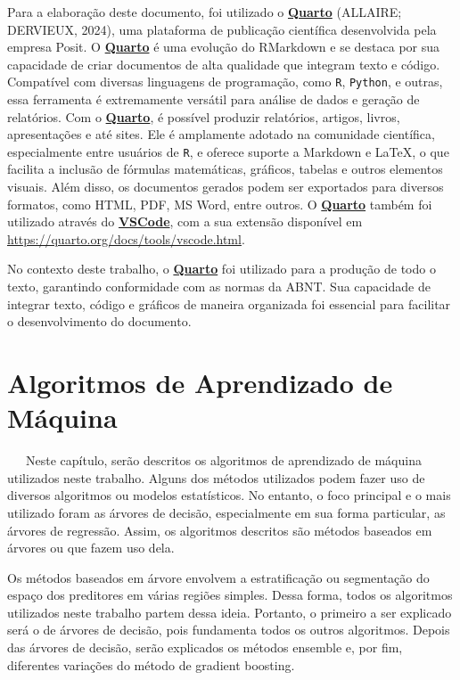 \documentclass[
  12pt,
  a4paper,
]{scrreprt}
\begin{document}
Para a elaboração deste documento, foi utilizado o
\href{https://quarto.org/}{\textbf{Quarto}} (ALLAIRE; DERVIEUX, 2024),
uma plataforma de publicação científica desenvolvida pela empresa Posit.
O \href{https://quarto.org/}{\textbf{Quarto}} é uma evolução do
RMarkdown e se destaca por sua capacidade de criar documentos de alta
qualidade que integram texto e código. Compatível com diversas
linguagens de programação, como \texttt{R}, \texttt{Python}, e outras,
essa ferramenta é extremamente versátil para análise de dados e geração
de relatórios. Com o \href{https://quarto.org/}{\textbf{Quarto}}, é
possível produzir relatórios, artigos, livros, apresentações e até
sites. Ele é amplamente adotado na comunidade científica, especialmente
entre usuários de \texttt{R}, e oferece suporte a Markdown e \LaTeX, o
que facilita a inclusão de fórmulas matemáticas, gráficos, tabelas e
outros elementos visuais. Além disso, os documentos gerados podem ser
exportados para diversos formatos, como HTML, PDF, MS Word, entre
outros. O \href{https://quarto.org/}{\textbf{Quarto}} também foi
utilizado através do
\href{https://code.visualstudio.com/}{\textbf{VSCode}}, com a sua
extensão disponível em \url{https://quarto.org/docs/tools/vscode.html}.

\vspace{12pt}

No contexto deste trabalho, o
\href{https://quarto.org/}{\textbf{Quarto}} foi utilizado para a
produção de todo o texto, garantindo conformidade com as normas da ABNT.
Sua capacidade de integrar texto, código e gráficos de maneira
organizada foi essencial para facilitar o desenvolvimento do documento.

\chapter{Algoritmos de Aprendizado de
Máquina}\label{algoritmos-de-aprendizado-de-muxe1quina}

~~~Neste capítulo, serão descritos os algoritmos de aprendizado de
máquina utilizados neste trabalho. Alguns dos métodos utilizados podem
fazer uso de diversos algoritmos ou modelos estatísticos. No entanto, o
foco principal e o mais utilizado foram as árvores de decisão,
especialmente em sua forma particular, as árvores de regressão. Assim,
os algoritmos descritos são métodos baseados em árvores ou que fazem uso
dela.

\vspace{12pt}

Os métodos baseados em árvore envolvem a estratificação ou segmentação
do espaço dos preditores em várias regiões simples. Dessa forma, todos
os algoritmos utilizados neste trabalho partem dessa ideia. Portanto, o
primeiro a ser explicado será o de árvores de decisão, pois fundamenta
todos os outros algoritmos. Depois das árvores de decisão, serão
explicados os métodos ensemble e, por fim, diferentes variações do
método de gradient boosting.
\end{document}
